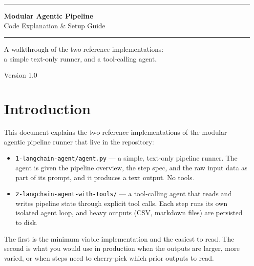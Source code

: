 \documentclass[12pt, a4paper]{article}
\begin{document}
\begin{titlepage}
  \centering
  \vspace*{3cm}
  {\color{primary}\rule{\linewidth}{2pt}}
  \vspace{1cm}

  {\Huge\bfseries\color{darktext} Modular Agentic Pipeline}\\[0.5em]
  {\Large\color{mutedtext} Code Explanation \& Setup Guide}

  \vspace{1cm}
  {\color{primary}\rule{\linewidth}{2pt}}

  \vspace{2cm}
  {\large\color{mutedtext}
    A walkthrough of the two reference implementations:\\
    a simple text-only runner, and a tool-calling agent.
  }

  \vfill
  {\small\color{mutedtext} Version 1.0}
\end{titlepage}

\tableofcontents
\newpage

\section{Introduction}

This document explains the two reference implementations of the modular agentic pipeline runner that live in the repository:

\begin{itemize}[leftmargin=1.5em]
  \item \texttt{1-langchain-agent/agent.py} — a simple, text-only pipeline runner. The agent is given the pipeline overview, the step spec, and the raw input data as part of its prompt, and it produces a text output. No tools.
  \item \texttt{2-langchain-agent-with-tools/} — a tool-calling agent that reads and writes pipeline state through explicit tool calls. Each step runs its own isolated agent loop, and heavy outputs (CSV, markdown files) are persisted to disk.
\end{itemize}

The first is the minimum viable implementation and the easiest to read. The second is what you would use in production when the outputs are larger, more varied, or when steps need to cherry-pick which prior outputs to read.
\end{document}
